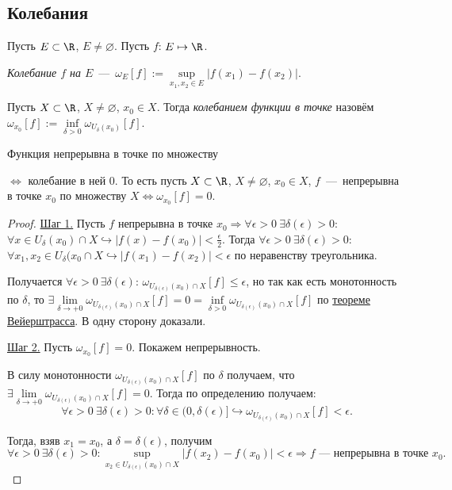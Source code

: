 \subsection{Колебания}
\begin{definition}
    Пусть $E \subset \R$, $E \neq \varnothing$. Пусть $f$: $E \mapsto \R$.
    
    \textit{Колебание $f$ на $E$}~---~$\omega_{E} [f] := \underset{x_{1}, x_{2} \in E}{\sup} |f (x_{1}) - f (x_{2})|$.
\end{definition}
\begin{definition}
    Пусть $X \subset \R$, $X \neq \varnothing$, $x_{0} \in X$. Тогда \textit{колебанием функции в точке} назовём $\omega_{x_{0}} [f] := \underset{\delta > 0}{\inf} \omega_{U_{\delta} (x_{0})} [f]$.
\end{definition}
\begin{theorem}
    \hypertarget{thm4.16}{Функция непрерывна в точке по множеству} $\Leftrightarrow$ колебание в ней 0. То есть пусть $X \subset \R$, $X \neq \varnothing$, $x_{0} \in X$, $f$~---~непрерывна в точке $x_{0}$ по множеству $X \Leftrightarrow \omega_{x_{0}} [f] = 0.$
\end{theorem}
\begin{proof}
    \underline{Шаг 1.} Пусть $f$ непрерывна в точке $x_{0} \Rightarrow \forall \epsilon > 0 \  \exists \delta (\epsilon) > 0$: $\forall x \in U_{\delta} (x_{0}) \cap X \hookrightarrow |f (x) - f (x_{0})| < \frac{\epsilon}{2}$. Тогда $\forall \epsilon > 0 \  \exists \delta (\epsilon) > 0$: $\forall x_{1}, x_{2} \in U_{\delta} (x_{0} \cap X \hookrightarrow |f (x_{1}) - f (x_{2})| < \epsilon$ по неравенству треугольника.

    Получается $\forall \epsilon > 0 \  \exists \delta (\epsilon)$: $\omega_{U_{\delta (\epsilon)} (x_{0}) \cap X} [f] \leq \epsilon$, но так как есть монотонность по $\delta$, то $\exists \lim\limits_{\delta\to +0} \omega_{U_{\delta (\epsilon)} (x_{0}) \cap X} [f] = 0 = \underset{\delta > 0}{\inf} \omega_{U_{\delta (\epsilon)} (x_{0}) \cap X} [f]$ по \hyperlink{thm4.5}{теореме Вейерштрасса}. В одну сторону доказали.

    \underline{Шаг 2.} Пусть $\omega_{x_{0}} [f] = 0$. Покажем непрерывность.

    В силу монотонности $\omega_{U_{\delta (\epsilon)} (x_{0}) \cap X} [f]$ по $\delta$ получаем, что $\exists \lim\limits_{\delta\to +0} \omega_{U_{\delta (\epsilon)} (x_{0}) \cap X} [f] = 0$. Тогда по определению получаем:
    $$ \forall \epsilon > 0 \  \exists \delta (\epsilon) > 0: \forall \delta \in \big(0, \delta (\epsilon)\big] \hookrightarrow \omega_{U_{\delta (\epsilon)} (x_{0}) \cap X} [f] < \epsilon.$$

    Тогда, взяв $x_{1} = x_{0}$, а $\delta = \delta (\epsilon)$, получим
    $$\forall \epsilon > 0 \  \exists \delta (\epsilon) > 0: \underset{x_{2} \in U_{\delta (\epsilon)} (x_{0}) \cap X}{\sup} |f (x_{2}) - f (x_{0})| < \epsilon \Rightarrow f\text{~---~непрерывна в точке } x_{0}.$$
\end{proof}
